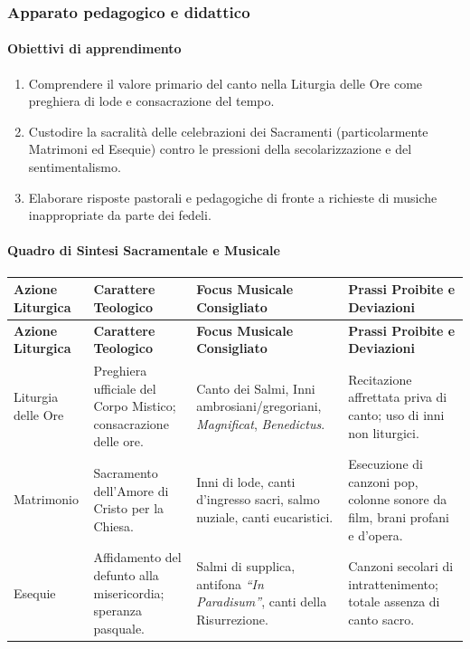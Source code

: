 \documentclass[12pt,a4paper]{article}
\begin{document}
	\subsubsection{Apparato pedagogico e didattico}\label{apparato-pedagogico-e-didattico-9}
	
	\paragraph{Obiettivi di apprendimento}\label{obiettivi-di-apprendimento-9}
	
	\begin{enumerate}[label=\arabic*.,leftmargin=*]
		\item Comprendere il valore primario del canto nella Liturgia delle Ore come preghiera di lode e consacrazione del tempo.
		\item Custodire la sacralità delle celebrazioni dei Sacramenti (particolarmente Matrimoni ed Esequie) contro le pressioni della secolarizzazione e del sentimentalismo.
		\item Elaborare risposte pastorali e pedagogiche di fronte a richieste di musiche inappropriate da parte dei fedeli.
	\end{enumerate}
	
	\paragraph{Quadro di Sintesi Sacramentale e Musicale}\label{quadro-di-sintesi-sacramentale-e-musicale}
	
	\begin{longtable}{L{2.5cm}L{3.5cm}L{3.5cm}L{4cm}}
		\toprule
		\textbf{Azione Liturgica} & \textbf{Carattere Teologico} & \textbf{Focus Musicale Consigliato} & \textbf{Prassi Proibite e Deviazioni} \\
		\midrule
		\endfirsthead
		\toprule
		\textbf{Azione Liturgica} & \textbf{Carattere Teologico} & \textbf{Focus Musicale Consigliato} & \textbf{Prassi Proibite e Deviazioni} \\
		\midrule
		\endhead
		\bottomrule
		\endlastfoot
		Liturgia delle Ore & Preghiera ufficiale del Corpo Mistico; consacrazione delle ore. & Canto dei Salmi, Inni ambrosiani/gregoriani, \emph{Magnificat}, \emph{Benedictus}. & Recitazione affrettata priva di canto; uso di inni non liturgici. \\
		Matrimonio & Sacramento dell'Amore di Cristo per la Chiesa. & Inni di lode, canti d'ingresso sacri, salmo nuziale, canti eucaristici. & Esecuzione di canzoni pop, colonne sonore da film, brani profani e d'opera. \\
		Esequie & Affidamento del defunto alla misericordia; speranza pasquale. & Salmi di supplica, antifona \emph{``In Paradisum''}, canti della Risurrezione. & Canzoni secolari di intrattenimento; totale assenza di canto sacro. \\
	\end{longtable}
	
\end{document}
